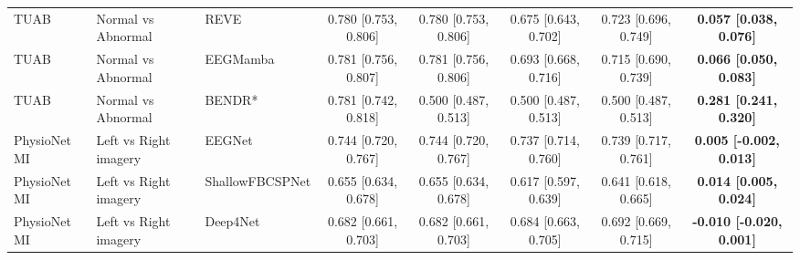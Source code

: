 \begin{tabular}{lllccccc}
TUAB & Normal vs Abnormal & REVE & 0.780 [0.753, 0.806] & 0.780 [0.753, 0.806] & 0.675 [0.643, 0.702] & 0.723 [0.696, 0.749] & \textbf{0.057 [0.038, 0.076]} \\
TUAB & Normal vs Abnormal & EEGMamba & 0.781 [0.756, 0.807] & 0.781 [0.756, 0.806] & 0.693 [0.668, 0.716] & 0.715 [0.690, 0.739] & \textbf{0.066 [0.050, 0.083]} \\
TUAB & Normal vs Abnormal & BENDR* & 0.781 [0.742, 0.818] & 0.500 [0.487, 0.513] & 0.500 [0.487, 0.513] & 0.500 [0.487, 0.513] & \textbf{0.281 [0.241, 0.320]} \\
\midrule
PhysioNet MI & Left vs Right imagery & EEGNet & 0.744 [0.720, 0.767] & 0.744 [0.720, 0.767] & 0.737 [0.714, 0.760] & 0.739 [0.717, 0.761] & \textbf{0.005 [-0.002, 0.013]} \\
PhysioNet MI & Left vs Right imagery & ShallowFBCSPNet & 0.655 [0.634, 0.678] & 0.655 [0.634, 0.678] & 0.617 [0.597, 0.639] & 0.641 [0.618, 0.665] & \textbf{0.014 [0.005, 0.024]} \\
PhysioNet MI & Left vs Right imagery & Deep4Net & 0.682 [0.661, 0.703] & 0.682 [0.661, 0.703] & 0.684 [0.663, 0.705] & 0.692 [0.669, 0.715] & \textbf{-0.010 [-0.020, 0.001]} \\
\bottomrule
\end{tabular}
